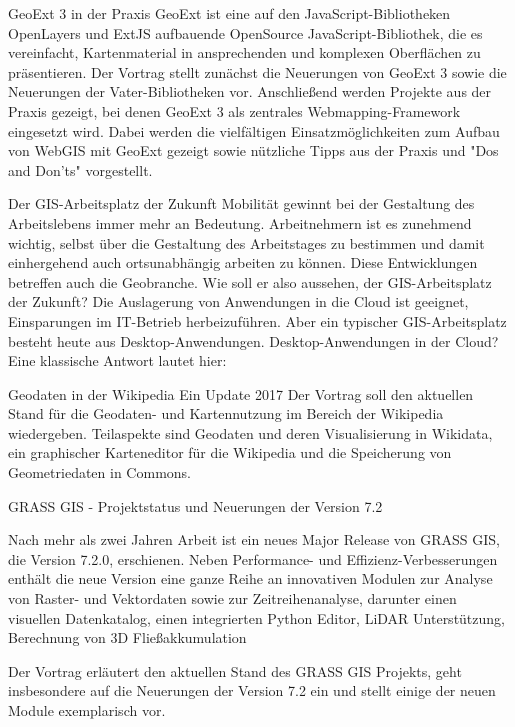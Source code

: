 
%
{GeoExt 3 in der Praxis}%
{}%
{GeoExt ist eine auf den JavaScript-Bibliotheken OpenLayers und ExtJS aufbauende OpenSource
  JavaScript-Bibliothek, die es vereinfacht, Kartenmaterial in ansprechenden und komplexen
  Oberflächen zu präsentieren.  Der Vortrag stellt zunächst die Neuerungen von GeoExt 3 sowie die
  Neuerungen der Vater-Bibliotheken
vor.  Anschließend werden Projekte aus der Praxis gezeigt, bei denen GeoExt 3 als zentrales
Webmapping-Framework eingesetzt wird. Dabei werden die vielfältigen Einsatzmöglichkeiten zum Aufbau
von WebGIS mit GeoExt gezeigt sowie nützliche Tipps aus der Praxis und "Dos and Don'ts"
vorgestellt.}

%
{Der GIS-Arbeitsplatz der Zukunft}%
{}%
{Mobilität gewinnt bei der Gestaltung des Arbeitslebens immer mehr an Bedeutung. Arbeitnehmern ist
es zunehmend wichtig, selbst über die Gestaltung des Arbeitstages zu bestimmen und damit
einhergehend auch ortsunabhängig arbeiten zu können. Diese Entwicklungen betreffen auch die
Geobranche. Wie soll er also aussehen, der GIS-Arbeitsplatz der Zukunft?  Die Auslagerung von
Anwendungen in die Cloud ist geeignet, Einsparungen im IT-Betrieb herbeizuführen. Aber ein typischer
GIS-Arbeitsplatz besteht heute aus Desktop-Anwendungen. Desktop-Anwendungen in der Cloud? Eine
klassische Antwort lautet hier:}

%
{Geodaten in der Wikipedia}%
{Ein Update 2017}%
{Der Vortrag soll den aktuellen Stand für die Geodaten- und Kartennutzung im Bereich der Wikipedia
wiedergeben. Teilaspekte sind Geodaten und deren Visualisierung in Wikidata, ein graphischer
Karteneditor für die Wikipedia und die Speicherung von Geometriedaten in Commons.  }


%
{GRASS GIS - Projektstatus und Neuerungen der Version 7.2}%
{}%
{Nach mehr als zwei Jahren Arbeit ist ein neues Major Release von GRASS GIS, die Version 7.2.0,
  erschienen. Neben Performance- und Effizienz-Verbesserungen enthält die neue Version eine ganze
  Reihe an innovativen Modulen zur Analyse von Raster- und Vektordaten sowie zur Zeitreihenanalyse,
  darunter einen visuellen Datenkatalog, einen integrierten Python Editor, LiDAR Unterstützung,
  Berechnung von 3D Fließakkumulation

Der Vortrag erläutert den aktuellen Stand des GRASS GIS Projekts, geht insbesondere auf die
Neuerungen der Version 7.2 ein und stellt einige der neuen Module exemplarisch vor.
}

